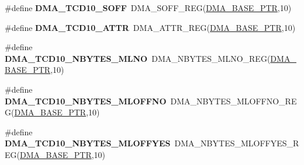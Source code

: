 \begin{DoxyCompactItemize}
\item 
\hypertarget{group___d_m_a___register___accessor___macros_ga1785c39374b58b8f0fb1fee6557b8c9e}{}\#define {\bfseries D\+M\+A\+\_\+\+T\+C\+D10\+\_\+\+S\+O\+F\+F}~D\+M\+A\+\_\+\+S\+O\+F\+F\+\_\+\+R\+E\+G(\hyperlink{group___d_m_a___peripheral_ga6997fbc1b1973e9f27170217a3bd6f22}{D\+M\+A\+\_\+\+B\+A\+S\+E\+\_\+\+P\+T\+R},10)\label{group___d_m_a___register___accessor___macros_ga1785c39374b58b8f0fb1fee6557b8c9e}

\item 
\hypertarget{group___d_m_a___register___accessor___macros_ga4ce82c87fd6f3680ce6c8deceb6653e7}{}\#define {\bfseries D\+M\+A\+\_\+\+T\+C\+D10\+\_\+\+A\+T\+T\+R}~D\+M\+A\+\_\+\+A\+T\+T\+R\+\_\+\+R\+E\+G(\hyperlink{group___d_m_a___peripheral_ga6997fbc1b1973e9f27170217a3bd6f22}{D\+M\+A\+\_\+\+B\+A\+S\+E\+\_\+\+P\+T\+R},10)\label{group___d_m_a___register___accessor___macros_ga4ce82c87fd6f3680ce6c8deceb6653e7}

\item 
\hypertarget{group___d_m_a___register___accessor___macros_ga4485cacfcff76d14742c66de54736970}{}\#define {\bfseries D\+M\+A\+\_\+\+T\+C\+D10\+\_\+\+N\+B\+Y\+T\+E\+S\+\_\+\+M\+L\+N\+O}~D\+M\+A\+\_\+\+N\+B\+Y\+T\+E\+S\+\_\+\+M\+L\+N\+O\+\_\+\+R\+E\+G(\hyperlink{group___d_m_a___peripheral_ga6997fbc1b1973e9f27170217a3bd6f22}{D\+M\+A\+\_\+\+B\+A\+S\+E\+\_\+\+P\+T\+R},10)\label{group___d_m_a___register___accessor___macros_ga4485cacfcff76d14742c66de54736970}

\item 
\hypertarget{group___d_m_a___register___accessor___macros_ga4d9e594844e687369d3029dc568e2892}{}\#define {\bfseries D\+M\+A\+\_\+\+T\+C\+D10\+\_\+\+N\+B\+Y\+T\+E\+S\+\_\+\+M\+L\+O\+F\+F\+N\+O}~D\+M\+A\+\_\+\+N\+B\+Y\+T\+E\+S\+\_\+\+M\+L\+O\+F\+F\+N\+O\+\_\+\+R\+E\+G(\hyperlink{group___d_m_a___peripheral_ga6997fbc1b1973e9f27170217a3bd6f22}{D\+M\+A\+\_\+\+B\+A\+S\+E\+\_\+\+P\+T\+R},10)\label{group___d_m_a___register___accessor___macros_ga4d9e594844e687369d3029dc568e2892}

\item 
\hypertarget{group___d_m_a___register___accessor___macros_ga90f9361236c52b090f87c26ef140b940}{}\#define {\bfseries D\+M\+A\+\_\+\+T\+C\+D10\+\_\+\+N\+B\+Y\+T\+E\+S\+\_\+\+M\+L\+O\+F\+F\+Y\+E\+S}~D\+M\+A\+\_\+\+N\+B\+Y\+T\+E\+S\+\_\+\+M\+L\+O\+F\+F\+Y\+E\+S\+\_\+\+R\+E\+G(\hyperlink{group___d_m_a___peripheral_ga6997fbc1b1973e9f27170217a3bd6f22}{D\+M\+A\+\_\+\+B\+A\+S\+E\+\_\+\+P\+T\+R},10)\label{group___d_m_a___register___accessor___macros_ga90f9361236c52b090f87c26ef140b940}


\end{DoxyCompactItemize}
